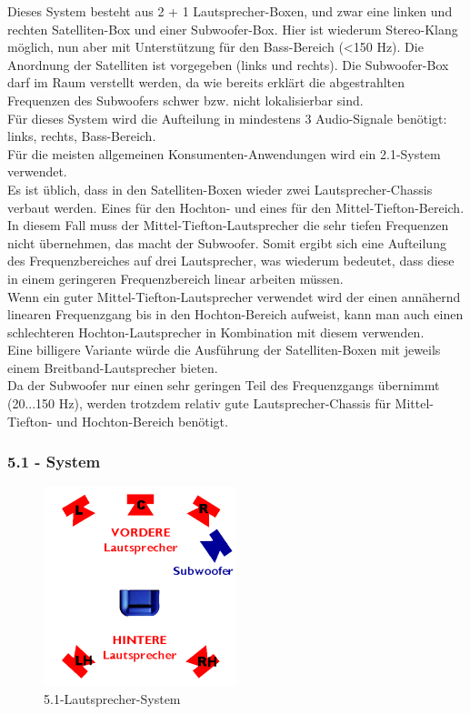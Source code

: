 Dieses System besteht aus 2 + 1 Lautsprecher-Boxen, und zwar eine linken und rechten Satelliten-Box und einer Subwoofer-Box.
Hier ist wiederum Stereo-Klang möglich, nun aber mit Unterstützung für den Bass-Bereich (<150 Hz).
Die Anordnung der Satelliten ist vorgegeben (links und rechts).
Die Subwoofer-Box darf im Raum verstellt werden, da wie bereits erklärt die abgestrahlten Frequenzen des Subwoofers schwer bzw. nicht lokalisierbar sind.\\
Für dieses System wird die Aufteilung in mindestens 3 Audio-Signale benötigt:
links, rechts, Bass-Bereich.\\
Für die meisten allgemeinen Konsumenten-Anwendungen wird ein 2.1-System verwendet.\\ 
Es ist üblich, dass in den Satelliten-Boxen wieder zwei Lautsprecher-Chassis verbaut werden.
Eines für den Hochton- und eines für den Mittel-Tiefton-Bereich.
In diesem Fall muss der Mittel-Tiefton-Lautsprecher die sehr tiefen Frequenzen nicht übernehmen, das macht der Subwoofer.
Somit ergibt sich eine Aufteilung des Frequenzbereiches auf drei Lautsprecher, was wiederum bedeutet, dass diese in einem geringeren Frequenzbereich linear arbeiten müssen.\\
Wenn ein guter Mittel-Tiefton-Lautsprecher verwendet wird der einen annähernd linearen Frequenzgang bis in den Hochton-Bereich aufweist, kann man auch einen schlechteren Hochton-Lautsprecher in Kombination mit diesem verwenden.\\
Eine billigere Variante würde die Ausführung der Satelliten-Boxen mit jeweils einem Breitband-Lautsprecher bieten.\\
Da der Subwoofer nur einen sehr geringen Teil des Frequenzgangs übernimmt (20...150 Hz), werden trotzdem relativ gute Lautsprecher-Chassis für Mittel-Tiefton- und Hochton-Bereich benötigt.



\subsubsection*{5.1 - System}
\begin{figure} [H]
	\centering
	\includegraphics[width=0.5\textwidth]{img/Grundlagen/Mehrweg-Lautsprechersysteme/DOLBYDigital51-cut.jpg}
	\caption{5.1-Lautsprecher-System}
	\label{fig:3.2.6}
\end{figure}

